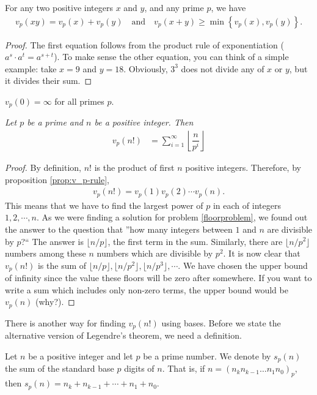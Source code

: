 \documentclass[12pt]{subfile}
\begin{document}
\begin{proposition} \label{prop:v_p-rule}
	For any two positive integers $x$ and $y$, and any prime $p$, we have
		\begin{align*}
		v_p(xy)=v_p(x)+v_p(y) \quad \text{and} \quad v_p(x+y)\geq\min\left\{v_p(x),v_p(y)\right\}.
		\end{align*}
\end{proposition}

\begin{proof}
	The first equation follows from the product rule of exponentiation ($a^{s} \cdot a^{t} = a^{s+t}$). To make sense the other equation, you can think of a simple example: take $x=9$ and $y=18$. Obviously, $3^3$ does not divide any of $x$ or $y$, but it divides their sum.
\end{proof}

\begin{note}
	$v_p(0)=\infty$ for all primes $p.$
\end{note}

\begin{theorem}\label{thm:legendre}\slshape
	Let $p$ be a prime and $n$ be a positive integer. Then
		\begin{align*}
		v_p(n!) & =\sum_{i=1}^{\infty}\left\lfloor\dfrac{n}{p^i}\right\rfloor
		\end{align*}
\end{theorem}

\begin{proof}
	By definition, $n!$ is the product of first $n$ positive integers. Therefore, by proposition \ref{prop:v_p-rule},
		\begin{align*}
			v_p(n!) = v_p(1) v_p(2) \cdots v_p(n).
		\end{align*}
	This means that we have to find the largest power of $p$ in each of integers $1,2,\cdots, n$. As we were finding a solution for problem \ref{floorproblem}, we found out the answer to the question that ''how many integers between $1$ and $n$ are divisible by $p$?`` The answer is $\lfloor n/p \rfloor$, the first term in the sum. Similarly, there are $\lfloor n/p^2 \rfloor$ numbers among these $n$ numbers which are divisible by $p^2$. It is now clear that $v_p(n!)$ is the sum of $\lfloor n/p \rfloor, \lfloor n/p^2 \rfloor, \lfloor n/p^3 \rfloor, \cdots$. We have chosen the upper bound of infinity since the value these floors will be zero after somewhere. If you want to write a sum which includes only non-zero terms, the upper bound would be $v_p(n)$ (why?).
\end{proof}
There is another way for finding $v_p(n!)$ using bases. Before we state the alternative version of Legendre's theorem, we need a definition.
\begin{definition}
	Let $n$ be a positive integer and let $p$ be a prime number.  We denote by $s_p(n)$  the sum of the standard base $p$ digits of $n$. That is, if $n=(n_k n_{k-1}\ldots n_1 n_0)_p$, then $s_p(n)=n_k+ n_{k-1}+\cdots +n_1+ n_0$.
\end{definition}
\end{document}
